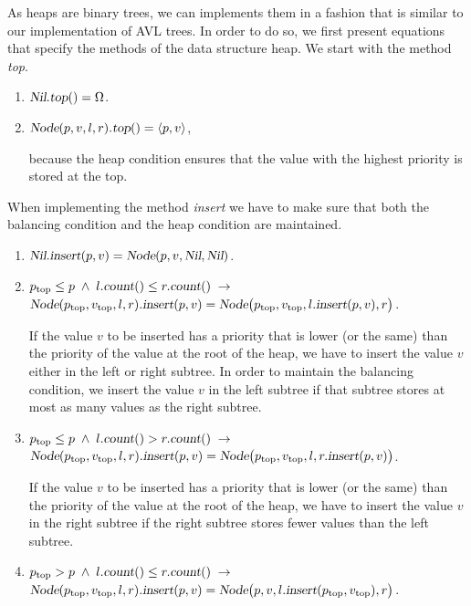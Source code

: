 As heaps are binary trees, we can implements them in a fashion that is similar to our implementation
of AVL trees.  In order to do so, we first present equations that specify the methods of the data
structure heap.  We start with the method \textsl{top}.  
\begin{enumerate}
\item $\textsl{Nil}.\textsl{top}() = \Omega$.
\item $\textsl{Node}(p,v,l,r).\textsl{top}() = \pair(p,v)$,

      because the heap condition ensures that the value with the highest priority is stored at the
      top. 
\end{enumerate}
When  implementing the method \textsl{insert} we have to make sure that both the balancing condition
and the heap condition are maintained.
\begin{enumerate}
\item $\textsl{Nil}.\textsl{insert}(p,v) = \textsl{Node}(p,v,\textsl{Nil}, \textsl{Nil})$.
\item $p_{\mathrm{top}} \leq p \;\wedge\; l.\textsl{count}() \leq r.\textsl{count}() \;\rightarrow $   \\[0.1cm]
      \hspace*{1.3cm} 
      $\textsl{Node}(p_{\mathrm{top}},v_\mathrm{top},l,r).\textsl{insert}(p,v) =
                 \textsl{Node}\bigl(p_\mathrm{top},v_\mathrm{top},l.\textsl{insert}(p,v), r\bigr)$.
                 
      If the value $v$ to be inserted has a priority that is lower (or the same) than the priority of
      the value at the root of the heap, we have to insert the value $v$ either in the left or right
      subtree.  In order to maintain the balancing condition, we insert the value $v$ in the left
      subtree if that subtree stores at most as many values as the right subtree.
\item $p_{\mathrm{top}} \leq p \;\wedge\; l.\textsl{count}() > r.\textsl{count}() \;\rightarrow $   \\[0.1cm]
      \hspace*{1.3cm} 
      $\textsl{Node}(p_{\mathrm{top}},v_\mathrm{top},l,r).\textsl{insert}(p,v) =
                 \textsl{Node}\bigl(p_\mathrm{top},v_\mathrm{top},l,r.\textsl{insert}(p,v)\bigr)$.

      If the value $v$ to be inserted has a priority that is lower (or the same) than the priority of
      the value at the root of the heap, we have to insert the value $v$ in the right
      subtree if the right subtree  stores fewer values than the left subtree.
\item $p_{\mathrm{top}} > p \;\wedge\; l.\textsl{count}() \leq r.\textsl{count}() \;\rightarrow $ \\[0.1cm]
      \hspace*{1.3cm} 
      $\textsl{Node}(p_{\mathrm{top}},v_\mathrm{top},l,r).\textsl{insert}(p,v) =
                 \textsl{Node}\bigl(p,v,l.\textsl{insert}(p_\mathrm{top},v_\mathrm{top}), r\bigr)$.


\end{enumerate}
